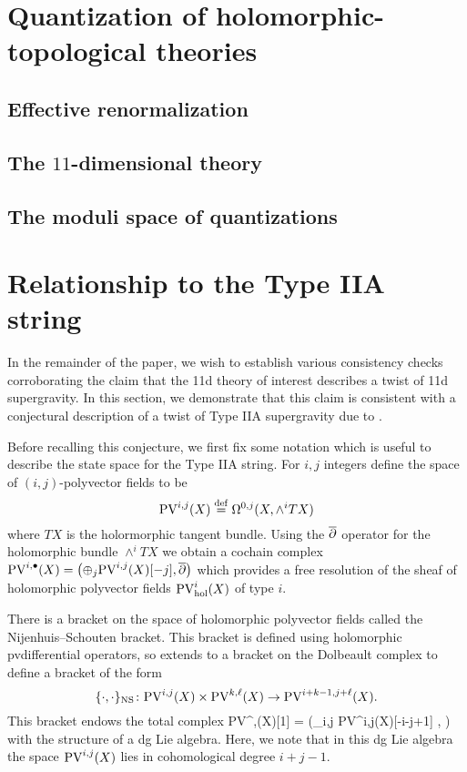 \documentclass[11pt]{amsart}
\def\pv{{\rm PV}}
\def\PV{{\rm PV}}
\begin{document}
\section{Quantization of holomorphic-topological theories}
\label{sec:org297a559}
\subsection{Effective renormalization}
\label{sec:orga5cd4ed}
\subsection{The \(11\)-dimensional theory}
\label{sec:org8b189fc}
\subsection{The moduli space of quantizations}
\label{sec:orgf278b4e}
\section{Relationship to the Type IIA string}
\label{sec:org355a726}
In the remainder of the paper, we wish to establish various consistency checks corroborating the claim that the 11d theory of interest describes a twist of 11d supergravity. In this section, we demonstrate that this claim is consistent with a conjectural description of a twist of Type IIA supergravity due to \cite{CLsugra}.

Before recalling this conjecture, we first fix some notation which is useful to describe the state space for the Type IIA string. 
For $i,j$ integers define the space of $(i,j)$-polyvector fields to be
\[
  \pv^{i,j}(X) \define \Omega^{0,j}(X, \wedge^{i} TX)
\]
where $TX$ is the holormorphic tangent bundle.
Using the $\overline{\partial}$ operator for the holomorphic bundle $\wedge^{i}TX$ we obtain a cochain complex $\pv^{i,\bu}(X) = \left(\oplus_{j} \pv^{i,j}(X) [-j], \dbar \right)$ which provides a free resolution of the sheaf of holomorphic polyvector fields $\PV^{i}_{\rm hol}(X)$ of type $i$.

There is a bracket on the space of holomorphic polyvector fields called the Nijenhuis--Schouten bracket.
This bracket is defined using holomorphic pvdifferential operators, so extends to a bracket on the Dolbeault complex to define a bracket of the form
\[
  \{\cdot, \cdot\}_{\rm NS} \colon \pv^{i,j}(X) \times \pv^{k,\ell}(X) \to \PV^{i+k-1, j+\ell}(X) .
\]
This bracket endows the total complex
\beqn\label{eqn:pvlie1}
\pv^{\bu,\bu}(X)[1] = \left(\oplus_{i,j} \pv^{i,j}(X)[-i-j+1] , \dbar \right)
\eeqn
with the structure of a dg Lie algebra.
Here, we note that in this dg Lie algebra the space $\pv^{i,j}(X)$ lies in cohomological degree $i+j-1$.
\end{document}
